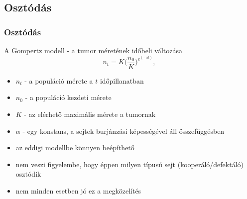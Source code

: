 \subsection{Osztódás}
\begin{frame}
	\frametitle{Osztódás}
	\begin{block}{A Gompertz modell - a tumor méretének időbeli változása}
		\begin{equation}
			n_t = K \bigg(\frac{n_0}{K} \bigg) ^ {e^{(- \alpha t)}},
		\end{equation}
		\begin{itemize}
			\item $n_t$ - a populáció mérete a $t$ időpillanatban
			\item $n_0$ - a populáció kezdeti mérete
			\item $K$ - az elérhető maximális mérete a tumornak
			\item $\alpha$ - egy konstans, a sejtek burjánzási képességével áll összefüggésben
		\end{itemize}
	\end{block}
	\pause
	\begin{block}{}
		\begin{itemize}
			\item az eddigi modellbe könnyen beépíthető
			\item nem veszi figyelembe, hogy éppen milyen típusú sejt (kooperáló/defektáló) osztódik
			\item nem minden esetben jó ez a megközelítés
		\end{itemize}
	\end{block}
\end{frame}